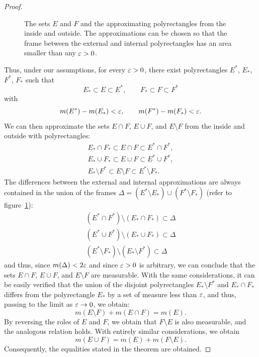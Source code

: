 \begin{proof}
\begin{figure}
  \centering
  \caption{The sets $E$ and $F$ and the approximating polyrectangles from the inside and outside. The approximations can be chosen so that the frame between the external and internal polyrectangles has an area smaller than any $\varepsilon>0$.}
  \label{fig:PeanoJordan}
\end{figure}
Thus, under our assumptions, for every $\varepsilon>0$, there exist polyrectangles
$E^*$, $E_*$, $F^*$, $F_*$ such that
\[
   E_* \subset E \subset E^*, \qquad
   F_* \subset F \subset F^*
\]
with
\[
  m(E^*)-m(E_*) < \varepsilon,\qquad
  m(F^*)-m(F_*) < \varepsilon.
\]
We can then approximate the sets $E\cap F$, $E\cup F$, and $E\setminus F$ from
the inside and outside with polyrectangles:
\begin{gather*}
  E_*\cap F_* \subset E\cap F \subset E^*\cap F^*, \\
  E_*\cup F_* \subset E\cup F \subset E^* \cup F^*, \\
  E_* \setminus F^* \subset E\setminus F \subset E^*\setminus F_*.
\end{gather*}
The differences between the external and internal approximations are always
contained in the union of the frames $\Delta = (E^*\setminus E_*)\cup
(F^*\setminus F_*)$ (refer to figure~\ref{fig:PeanoJordan}):
\begin{align*}
  (E^*\cap F^*) \setminus (E_* \cap F_*) \subset \Delta \\
  (E^*\cup F^*) \setminus (E_*\cup F_*) \subset \Delta \\
  (E^*\setminus F_*) \setminus (E_* \setminus F^*) \subset \Delta
\end{align*}
and thus, since $m(\Delta)<2\varepsilon$ and since $\varepsilon>0$ is arbitrary, we can
conclude that the sets $E\cap F$, $E\cup F$, and $E\setminus F$ are measurable.
With the same considerations, it can be easily verified that the union of the
disjoint polyrectangles $E_*\setminus F^*$ and $E_*\cap F_*$ differs from the
polyrectangle $E_*$ by a set of measure less than $\varepsilon$, and thus, passing to
the limit as $\varepsilon\to 0$, we obtain:
\[
  m(E\setminus F) + m(E\cap F) = m(E).
\]
By reversing the roles of $E$ and $F$, we obtain that $F\setminus E$ is also
measurable, and the analogous relation holds. With entirely similar
considerations, we obtain
\[
  m(E\cup F) = m(E) + m(F\setminus E).
\]
Consequently, the equalities stated in the theorem are obtained.
\end{proof}

